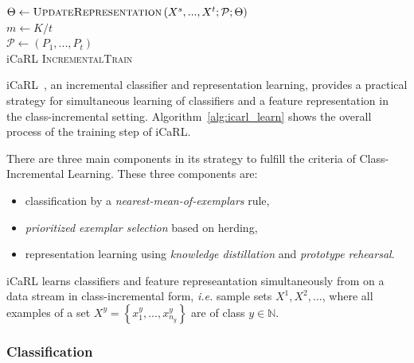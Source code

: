 \begin{algorithm}[ht]
  $\Theta \leftarrow \textsc{UpdateRepresentation}\left(X^s, ..., X^t;\mathcal{P};\Theta\right)$ \\
  $m \leftarrow K/t$  \\
  $\mathcal{P} \leftarrow \left(P_1, ..., P_t\right)$  \\
\caption{ iCaRL \textsc{IncrementalTrain} \label{alg:icarl_learn}}
\end{algorithm}


iCaRL~\cite{Rebuffi:2016aa}, an incremental classifier and representation learning, provides a practical strategy for simultaneous learning of classifiers and a feature representation in the class-incremental setting. Algorithm~\ref{alg:icarl_learn} shows the overall process of the training step of iCaRL.

There are three main components in its strategy to fulfill the criteria of Class-Incremental Learning. These three components are:

\begin{itemize}
  \item classification by a \textit{nearest-mean-of-exemplars} rule,
  \item \textit{prioritized exemplar selection} based on herding,
  \item representation learning using \textit{knowledge distillation} and \textit{prototype rehearsal}.
\end{itemize}

iCaRL learns classifiers and feature represeantation simultaneously from on a data stream in class-incremental form, \textit{i.e.} sample sets $X^1, X^2, ...$, where all examples of a set $X^y = \left\{ x_1^y, ..., x_{n_y}^y \right\}$ are of class $y \in \mathbb{N}$.

\subsubsection{Classification}
\label{sec:icarl_classification}


